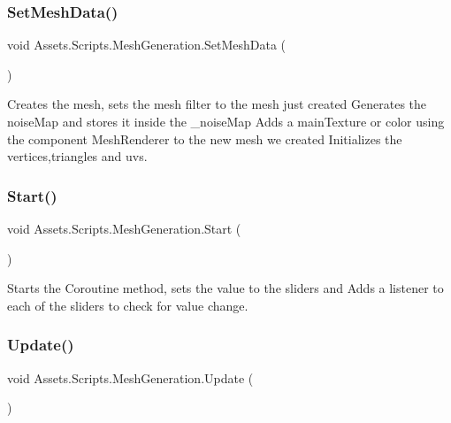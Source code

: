 \subsubsection{\texorpdfstring{SetMeshData()}{SetMeshData()}}
{\footnotesize\ttfamily void Assets.\+Scripts.\+Mesh\+Generation.\+Set\+Mesh\+Data (\begin{DoxyParamCaption}{ }\end{DoxyParamCaption})}



Creates the mesh, sets the mesh filter to the mesh just created Generates the noise\+Map and stores it inside the \+\_\+noise\+Map Adds a main\+Texture or color using the component Mesh\+Renderer to the new mesh we created Initializes the vertices,triangles and uvs. 

\mbox{\label{class_assets_1_1_scripts_1_1_mesh_generation_a41b690987228c88da57a68df85864fb8}} 
\subsubsection{\texorpdfstring{Start()}{Start()}}
{\footnotesize\ttfamily void Assets.\+Scripts.\+Mesh\+Generation.\+Start (\begin{DoxyParamCaption}{ }\end{DoxyParamCaption})\hspace{0.3cm}{\ttfamily [private]}}



Starts the Coroutine method, sets the value to the sliders and Adds a listener to each of the sliders to check for value change. 

\mbox{\label{class_assets_1_1_scripts_1_1_mesh_generation_a4cb917bfef5c78eba6e24157eb187e4d}} 
\subsubsection{\texorpdfstring{Update()}{Update()}}
{\footnotesize\ttfamily void Assets.\+Scripts.\+Mesh\+Generation.\+Update (\begin{DoxyParamCaption}{ }\end{DoxyParamCaption})\hspace{0.3cm}{\ttfamily [private]}}



